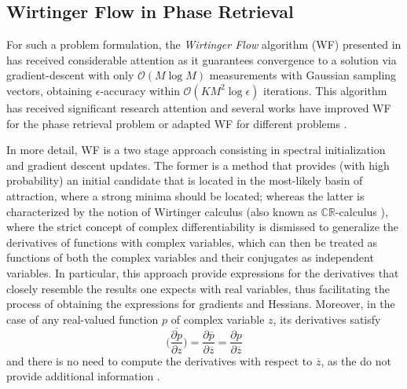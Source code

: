 \subsection{Wirtinger Flow in Phase Retrieval}
For such a problem formulation, the \textit{Wirtinger Flow} algorithm (WF) presented in \cite{Candes2015a_phaseretrievalWF} has received considerable attention as it guarantees convergence to a solution via gradient-descent with only $\mathcal{O}(M\log M)$ measurements with Gaussian sampling vectors, obtaining  $\epsilon$-accuracy within $\mathcal{O}(KM^2\log\epsilon)$ iterations. This algorithm has received significant research attention and several works have improved WF for the phase retrieval problem \cite{Chen2015truncatedwf,Zhang2017reshapedwf,Bostan2018AcceleratedWF} or adapted WF for different problems \cite{Dong2018blinddemixingwf,Dong2018otacompwf}. 

In more detail, WF is a two stage approach consisting in spectral initialization and gradient descent updates. The former is a method that provides (with high probability) an initial candidate that is located in the most-likely basin of attraction, where a strong minima should be located; whereas the latter is characterized by the notion of Wirtinger calculus (also known as $\mathbb{CR}$-calculus \cite{Kreutz2009wirtinger}), where the strict concept of complex differentiability is dismissed to generalize the derivatives of functions with complex variables, which can then be treated as functions of both the complex variables and their conjugates as independent variables. In particular, this approach provide expressions for the derivatives that closely resemble the results one expects with real variables, thus facilitating the process of obtaining the expressions for gradients and Hessians. Moreover, in the case of any real-valued function $p$ of complex variable $z$, its derivatives satisfy
\begin{equation}
\overline{\bigg({\frac{\partial p}{\partial z}}\bigg)}=\frac{\partial \overline{p}}{\partial \overline{z}}=\frac{\partial p}{\partial \overline{z}}
\end{equation}
and there is no need to compute the derivatives with respect to $\overline{z}$, as the do not provide additional information \cite{Kreutz2009wirtinger}. 

